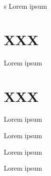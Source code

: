 \documentclass{article}
\begin{document}
s
\newpage
Lorem ipsum

\section{XXX}

Lorem ipsum


\section{XXX}

Lorem ipsum



\newpage
\beginnumbering
\autopar
\pstart Lorem ipsum
\pend


Lorem ipsum
\pend

Lorem ipsum
\pend
\endnumbering
\end{document}
